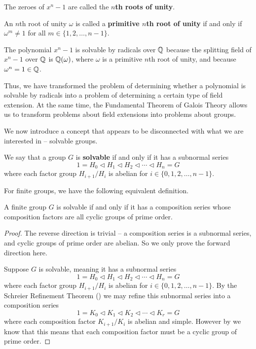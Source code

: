\begin{definition}
    The zeroes of $x^n - 1$ are called the \textbf{$n$th roots of unity}.
\end{definition}

\begin{definition}
    An $n$th root of unity $\omega$ is called a \textbf{primitive $n$th root of unity} if and only if $\omega^m \neq 1$ for all $m \in \{1, 2, \dots, n-1\}$.
\end{definition}

\begin{example}
    The polynomial $x^n - 1$ is solvable by radicals over $\mathbb{Q}$ because the splitting field of $x^n - 1$ over $\mathbb{Q}$ is $\mathbb{Q}(\omega)$, where $\omega$ is a primitive $n$th root of unity, and because $\omega^n = 1 \in \mathbb{Q}$.
\end{example}

Thus, we have transformed the problem of determining whether a polynomial is solvable by radicals into a problem of determining a certain type of field extension. At the same time, the Fundamental Theorem of Galois Theory allows us to transform problems about field extensions into problems about groups.

We now introduce a concept that appears to be disconnected with what we are interested in -- solvable groups.

\begin{definition}
    We say that a group $G$ is \textbf{solvable} if and only if it has a subnormal series
    \[
        1 = H_0 \lhd H_1 \lhd H_2 \lhd \cdots \lhd H_n = G
    \]
    where each factor group $H_{i+1}/H_i$ is abelian for $i \in \{0, 1, 2, \dots, n-1\}$.
\end{definition}

For finite groups, we have the following equivalent definition.

\begin{proposition}\label{prop-solvable-equivalence-for-finite-groups}
    A finite group $G$ is solvable if and only if it has a composition series whose composition factors are all cyclic groups of prime order.
\end{proposition}
\begin{proof}
    The reverse direction is trivial -- a composition series is a subnormal series, and cyclic groups of prime order are abelian. So we only prove the forward direction here.

    Suppose $G$ is solvable, meaning it has a subnormal series
    \[
        1 = H_0 \lhd H_1 \lhd H_2 \lhd \cdots \lhd H_n = G
    \]
    where each factor group $H_{i+1}/H_i$ is abelian for $i \in \{0, 1, 2, \dots, n-1\}$. By the Schreier Refinement Theorem () we may refine this subnormal series into a composition series
    \[
        1 = K_0 \lhd K_1 \lhd K_2 \lhd \cdots \lhd K_r = G
    \]
    where each composition factor $K_{i+1}/K_i$ is abelian and simple. However by  we know that this means that each composition factor must be a cyclic group of prime order.
\end{proof}


